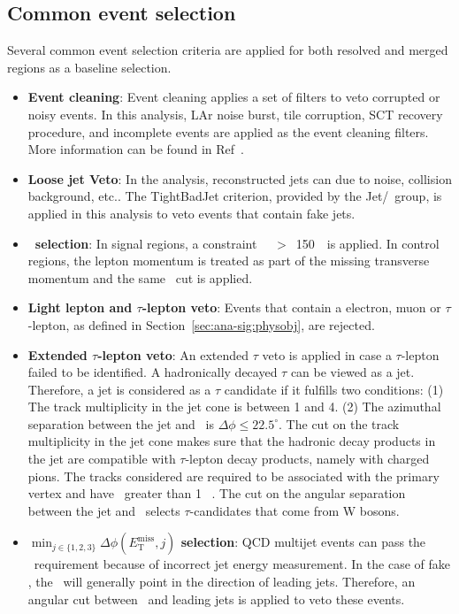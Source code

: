 \subsection{Common event selection}
\par Several common event selection criteria are applied for both resolved and merged regions as a baseline selection.
\begin{itemize}
    \item \textbf{Event cleaning}: Event cleaning applies a set of filters to veto corrupted or noisy events. In this analysis, LAr noise burst, tile corruption, SCT recovery procedure, and incomplete events are applied as the event cleaning filters. More information can be found in Ref~\cite{c8-evt-cleaning}.
    \item \textbf{Loose jet Veto}: In the analysis, reconstructed jets can due to noise, collision background, etc.. The TightBadJet criterion, provided by the Jet/\met~group, is applied in this analysis to veto events that contain fake jets.
    \item \textbf{\met~selection}: In signal regions, a constraint \met~~$>$~150~\GeV~is applied. In control regions, the lepton momentum is treated as part of the missing transverse momentum and the same \met~cut is applied.
    \item \textbf{Light lepton and $\tau$-lepton veto}: Events that contain a electron, muon or $\tau$-lepton, as defined in Section~\ref{sec:ana-sig:physobj}, are rejected.
    \item \textbf{Extended $\tau$-lepton veto}: An extended $\tau$ veto is applied in case a $\tau$-lepton failed to be identified. A hadronically decayed $\tau$ can be viewed as a jet. Therefore, a jet is considered as a $\tau$ candidate if it fulfills two conditions: (1) The track multiplicity in the jet cone is between 1 and 4. (2) The azimuthal separation between the jet and \met~is $\Delta \phi \leq 22.5^\circ$. The cut on the track multiplicity in the jet cone makes sure that the hadronic decay products in the jet are compatible with $\tau$-lepton decay products, namely with charged pions. The tracks considered are required to be associated with the primary vertex and have \pt~greater than 1 ~\GeV. The cut on the angular separation between the jet and \met~selects $\tau$-candidates that come from W bosons.
    \item \textbf{$\min_{j \in \{1,2,3\}}\Delta\phi(E_{\mathrm{T}}^{\mathrm{miss}},j)$ selection}: QCD multijet events can pass the \met~requirement because of incorrect jet energy measurement. In the case of fake \met, the \met~will generally point in the direction of leading jets. Therefore, an angular cut between \met~and leading jets is applied to veto these events.
\end{itemize}

